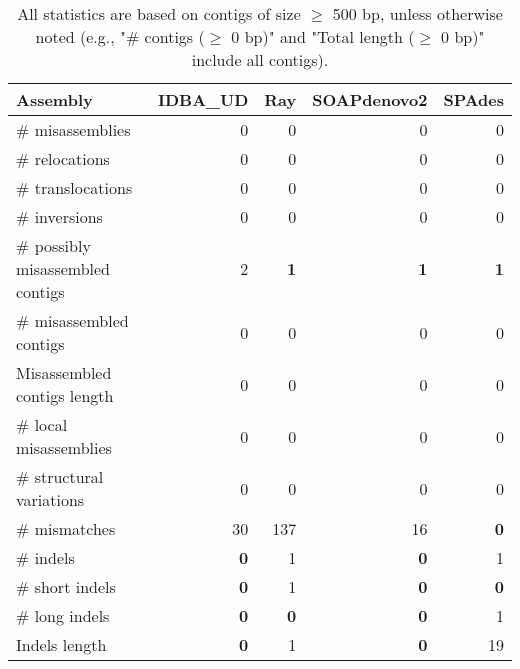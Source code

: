 \documentclass[12pt,a4paper]{article}
\begin{document}
\begin{table}[ht]
\begin{center}
\caption{All statistics are based on contigs of size $\geq$ 500 bp, unless otherwise noted (e.g., "\# contigs ($\geq$ 0 bp)" and "Total length ($\geq$ 0 bp)" include all contigs).}
\begin{tabular}{|l*{4}{|r}|}
\hline
Assembly & IDBA\_UD & Ray & SOAPdenovo2 & SPAdes \\ \hline
\# misassemblies & 0 & 0 & 0 & 0 \\ \hline
\hspace{5mm}\# relocations & 0 & 0 & 0 & 0 \\ \hline
\hspace{5mm}\# translocations & 0 & 0 & 0 & 0 \\ \hline
\hspace{5mm}\# inversions & 0 & 0 & 0 & 0 \\ \hline
\# possibly misassembled contigs & 2 & {\bf 1} & {\bf 1} & {\bf 1} \\ \hline
\# misassembled contigs & 0 & 0 & 0 & 0 \\ \hline
Misassembled contigs length & 0 & 0 & 0 & 0 \\ \hline
\# local misassemblies & 0 & 0 & 0 & 0 \\ \hline
\# structural variations & 0 & 0 & 0 & 0 \\ \hline
\# mismatches & 30 & 137 & 16 & {\bf 0} \\ \hline
\# indels & {\bf 0} & 1 & {\bf 0} & 1 \\ \hline
\hspace{5mm}\# short indels & {\bf 0} & 1 & {\bf 0} & {\bf 0} \\ \hline
\hspace{5mm}\# long indels & {\bf 0} & {\bf 0} & {\bf 0} & 1 \\ \hline
Indels length & {\bf 0} & 1 & {\bf 0} & 19 \\ \hline
\end{tabular}
\end{center}
\end{table}
\end{document}

